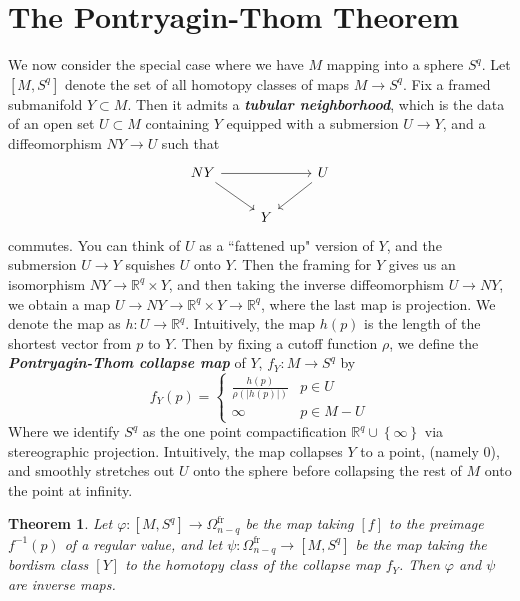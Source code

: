 \documentclass[psamsfonts]{amsart}
\newtheorem{thm}{Theorem}[section]
\theoremstyle{definition}
\theoremstyle{remark}
\newcommand{\R}{\mathbb{R}}
\newcommand{\ib}[1]{\textbf{\textit{#1}}}
\newcommand{\inv}{^{-1}}
\newcommand{\set}[1]{\left\lbrace #1 \right\rbrace}
\newcommand{\abs}[1]{\left\lvert#1\right\rvert}
\begin{document}
\section*{The Pontryagin-Thom Theorem}
%
We now consider the special case where we have $M$ mapping into a sphere $S^q$. Let $[M, S^q]$ denote the set of all homotopy classes of maps $M \to S^q$. Fix a framed submanifold $Y \subset M$. Then it admits a \ib{tubular neighborhood}, which is the data of an open set $U \subset M$ containing $Y$ equipped with a submersion $U \to Y$, and a diffeomorphism $NY \to U$ such that 
$$\begin{tikzcd} 
NY \ar[rr] \ar[dr] && U \ar[dl] \\
& Y
\end{tikzcd}$$
commutes. You can think of $U$ as a ``fattened up" version of $Y$, and the submersion $U \to Y$ squishes $U$ onto $Y$. Then the framing for $Y$ gives us an isomorphism $NY \to \R^q \times Y$, and then taking the inverse diffeomorphism $U \to NY$, we obtain a map $U \to NY \to \R^q \times Y \to \R^q$, where the last map is projection. We denote the map as $h : U \to \R^q$.  Intuitively, the map $h(p)$ is the length of the shortest vector from $p$ to $Y$. Then by fixing a cutoff function $\rho$, we define the \ib{Pontryagin-Thom collapse map} of $Y$, $f_Y : M \to S^q$ by
$$f_Y(p) = \begin{cases} 
\frac{h(p)}{\rho(\abs{h(p)})} & p \in U \\
\infty & p \in M - U
\end{cases}$$
Where we identify $S^q$ as the one point compactification $\R^q \cup \set{\infty}$ via stereographic projection. Intuitively, the map collapses $Y$ to a point, (namely $0$), and smoothly stretches out $U$ onto the sphere before collapsing the rest of $M$ onto the point at infinity.
%
\begin{thm}
Let $\varphi : [M,S^q] \to \Omega^{\text{fr}}_{n - q}$ be the map taking $[f]$ to the preimage $f\inv(p)$ of a regular value, and let $\psi : \Omega^{\text{fr}}_{n-q} \to [M, S^q]$ be the map taking the bordism class $[Y]$ to the homotopy class of the collapse map $f_Y$. Then $\varphi$ and $\psi$ are inverse maps.
\end{thm}
\end{document}
